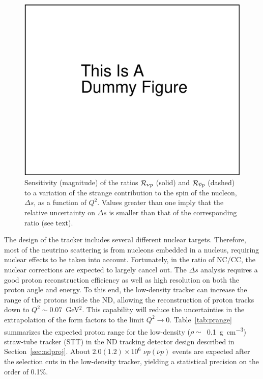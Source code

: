\begin{figure}[!htb]
\centering\includegraphics[width=.7\textwidth]{graphics/dummy.pdf}
\caption[Sensitivity of NC/CC to the strange contribution to nucleon spin]
{Sensitivity (magnitude) of the ratios ${\cal R}_{\nu p}$ (solid) and
${\cal R}_{\overline{\nu} p}$ (dashed) to a variation of the strange contribution to the
spin of the nucleon, $\Delta s$,
as a function of $Q^2$. Values greater than one imply that the relative uncertainty on $\Delta s$ is smaller than that of the corresponding ratio (see text).}
\label{fig-delta-s}
\end{figure}
The design of the %
tracker includes several
different nuclear targets.  Therefore, most of the neutrino scattering
is from nucleons embedded in a nucleus, requiring nuclear effects to
be taken into account. Fortunately, in the ratio of NC/CC, the nuclear
corrections are expected to largely cancel out.  The $\Delta s$
analysis requires a good proton reconstruction efficiency as well as
high resolution on both the proton angle and energy. To this end, the
low-density %
tracker can increase the range of the
protons inside the ND, allowing the reconstruction of proton tracks
down to $Q^2\sim0.07$~GeV$^2$. This capability will reduce the
uncertainties in the extrapolation of the form factors to the limit
$Q^2 \to 0$.
Table~\ref{tab:prange} summarizes the expected proton range for the
low-density ($\rho\sim$~\SI{0.1}{\gram\per\cubic\centi\meter}) straw-tube 
tracker (STT) in the ND tracking detector design described in
Section~\ref{sec:ndproj}.  About $2.0 (1.2) \times 10^6$ $\nu p
(\overline{\nu} p)$ events are expected after the selection cuts in
the low-density 
tracker, yielding a statistical precision on the order
of 0.1\%.
